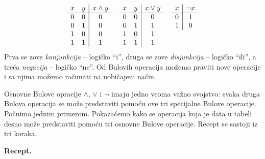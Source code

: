 $$
    \begin{array}{ccc}
        \begin{array}[t]{cc|c}
            x & y & x \land y \\
            \hline
            0 & 0 & 0 \\
            0 & 1 & 0 \\
            1 & 0 & 0 \\
            1 & 1 & 1
        \end{array} &
        \begin{array}[t]{cc|c}
            x & y & x \lor y \\
            \hline
            0 & 0 & 0 \\
            0 & 1 & 1 \\
            1 & 0 & 1 \\
            1 & 1 & 1
        \end{array} &
        \begin{array}[t]{c|c}
            x & \lnot x \\
            \hline
            0 & 1 \\
            1 & 0
        \end{array}
    \end{array}
$$
Prva se zove \emph{konjunkcija} -- logi\v cko \enquote{i}, druga se zove
\emph{disjunkcija} -- logi\v cko \enquote{ili}, a tre\'ca \emph{negacija}
-- logi\v cko \enquote{ne}.
Od Bulovih operacija mo\v zemo praviti nove operacije i sa njima mo\v zemo
ra\v cunati na uobi\v cajeni na\v cin.

Osnovne Bulove opracije $\land$, $\lor$ i $\lnot$ imaju jedno veoma va\v zno
svojstvo: svaka druga Bulova operacija se mo\v ze predstaviti pomo\'cu ove
tri specijalne Bulove operacije.
Po\v cnimo jednim primerom.
Pokaza\'cemo kako se operacija koja je data u tabeli desno
mo\v ze predstaviti pomo\'cu tri osnovne Bulove operacije.
Recept se sastoji iz tri koraka.

\clearpage

\noindent
\textbf{Recept.}

